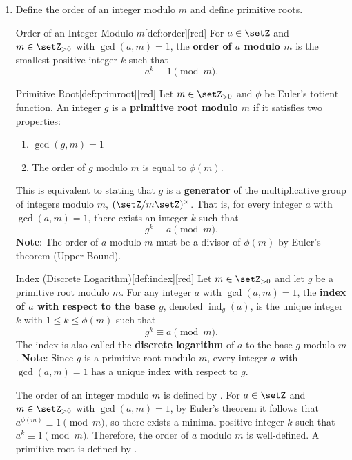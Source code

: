 \begin{enumerate}
  \newpage
  \item Define the order of an integer modulo $m$ and define primitive roots.
  \begin{define}{Order of an Integer Modulo $m$}[def:order][red]
  For $a\in\setZ$ and $m\in\setZ_{>0}$ with $\gcd(a,m)=1$, the \textbf{order of $a$ modulo $m$} is the smallest positive integer $k$ such that
  \[
  a^k \equiv 1 \pmod{m}.
  \]
  \end{define}
  \begin{define}{Primitive Root}[def:primroot][red]
    Let $m\in\setZ_{>0}$ and $\phi$ be Euler's totient function.
    An integer $g$ is a \textbf{primitive root modulo $m$} if it satisfies two properties:
    \begin{enumerate}
      \item $\gcd(g,m)=1$
      \item The order of $g$ modulo $m$ is equal to $\phi(m)$.
    \end{enumerate}
    This is equivalent to stating that $g$ is a \textbf{generator} of the multiplicative group of integers modulo $m$, $(\setZ/m\setZ)^\times$. That is, for every integer $a$ with $\gcd(a,m)=1$, there exists an integer $k$ such that
    \[
    g^k \equiv a \pmod m.
    \]
    \textbf{Note}: The order of $a$ modulo $m$ must be a divisor of $\phi(m)$ by Euler's theorem (Upper Bound).
    \end{define}
  \begin{define}{Index (Discrete Logarithm)}[def:index][red]
    Let $m\in\setZ_{>0}$ and let $g$ be a primitive root modulo $m$.
    For any integer $a$ with $\gcd(a,m)=1$, the \textbf{index of $a$ with respect to the base $g$}, denoted $\operatorname{ind}_g(a)$, is the unique integer $k$ with $1 \leq k \leq \phi(m)$ such that
    \[
    g^k \equiv a \pmod{m}.
    \]
    The index is also called the \textbf{discrete logarithm} of $a$ to the base $g$ modulo $m$.
    \textbf{Note}: Since $g$ is a primitive root modulo $m$, every integer $a$ with $\gcd(a,m)=1$ has a unique index with respect to $g$.
  \end{define}
  \begin{subprove}
    The order of an integer modulo $m$ is defined by .
    For $a \in \setZ$ and $m \in \setZ_{>0}$ with $\gcd(a,m)=1$, 
    by Euler's theorem it follows that $a^{\phi(m)} \equiv 1 \pmod{m}$, 
    so there exists a minimal positive integer $k$ such that $a^k \equiv 1 \pmod{m}$.
    Therefore, the order of $a$ modulo $m$ is well-defined.
    A primitive root is defined by .

\end{subprove}
\end{enumerate}

